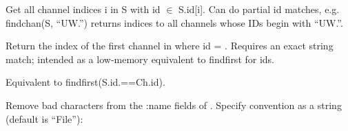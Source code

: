 \documentclass[letterpaper,11pt,english]{sphinxmanual}
\begin{document}

\begin{fulllineitems}
\end{fulllineitems}


Get all channel indices i in S with id \(\in\) S.id{[}i{]}. Can do partial id
matches, e.g. findchan(S, “UW.”) returns indices to all channels whose IDs begin
with “UW.”.

\begin{fulllineitems}
\label{\detokenize{src/working_with_data:findid}}
\end{fulllineitems}


Return the index of the first channel in  where id = . Requires an
exact string match; intended as a low-memory equivalent to findfirst for
ids.

\begin{fulllineitems}
\end{fulllineitems}


Equivalent to findfirst(S.id.==Ch.id).


\begin{fulllineitems}
\end{fulllineitems}


Remove bad characters from the :name fields of . Specify convention as a
string (default is “File”):
\end{document}

